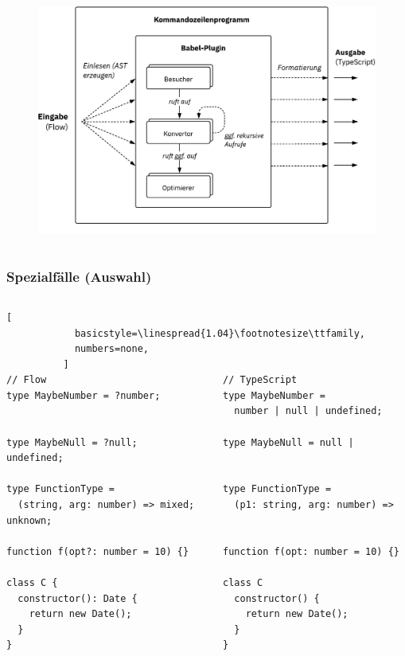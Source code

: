     \begin{frame}
      \vspace{1mm}
      \begin{columns}
        \column{\dimexpr\paperwidth-8mm}
        \begin{figure}
          \includegraphics[width=\textwidth]{src/figures/architecture-overview.pdf}
        \end{figure}
      \end{columns}
    \end{frame}

    \begin{frame}[fragile]
      \frametitle{Spezialfälle (Auswahl)}
      \begin{columns}
        \column{\dimexpr\paperwidth-11mm}
          \begin{lstlisting}[
            basicstyle=\linespread{1.04}\footnotesize\ttfamily,
            numbers=none,
          ]
// Flow                               // TypeScript
type MaybeNumber = ?number;           type MaybeNumber =
                                        number | null | undefined;

type MaybeNull = ?null;               type MaybeNull = null | undefined;

type FunctionType =                   type FunctionType =
  (string, arg: number) => mixed;       (p1: string, arg: number) => unknown;

function f(opt?: number = 10) {}      function f(opt: number = 10) {}

class C {                             class C
  constructor(): Date {                 constructor() {
    return new Date();                    return new Date();
  }                                     }
}                                     }
        \end{lstlisting}
      \end{columns}
    \end{frame}

